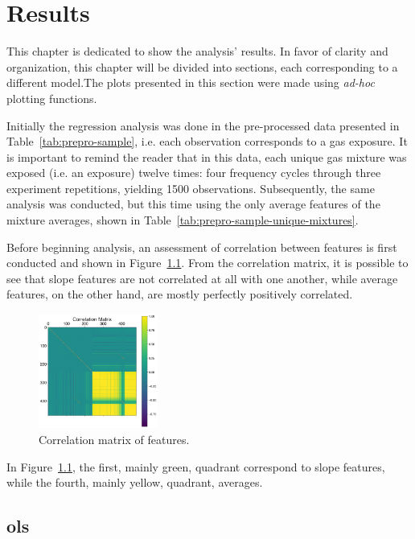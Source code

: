 \chapter{Results}
\label{cha:results}

This chapter is dedicated to show the analysis' results. In favor of clarity and organization, this chapter will be divided into sections, each corresponding to a different model.The plots presented in this section were made using \textit{ad-hoc} plotting functions.

Initially the regression analysis was done in the pre-processed data presented in Table~\ref{tab:prepro-sample}, i.e. each observation corresponds to a gas exposure. It is important to remind the reader that in this data, each unique gas mixture was exposed (i.e. an exposure) twelve times: four frequency cycles through three experiment repetitions, yielding 1500 observations. Subsequently, the same analysis was conducted, but this time using the only average features of the mixture averages, shown in Table~\ref{tab:prepro-sample-unique-mixtures}.

Before beginning analysis, an assessment of correlation between features is first conducted and shown in Figure~\ref{fig:cor-mat}. From the correlation matrix, it is possible to see that slope features are not correlated at all with one another, while average features, on the other hand, are mostly perfectly positively correlated.

\begin{figure}[h]
	\centering
	\includegraphics[width=0.35\textwidth]{../figures/correlation-matrix.png}
	\caption{Correlation matrix of features.}
	
	\label{fig:cor-mat}
\end{figure}

In Figure~\ref{fig:cor-mat}, the first, mainly green, quadrant correspond to slope features, while the fourth, mainly yellow, quadrant, averages.

\clearpage
\section{\acrlong{ols}}
\label{sec:results-ols}

